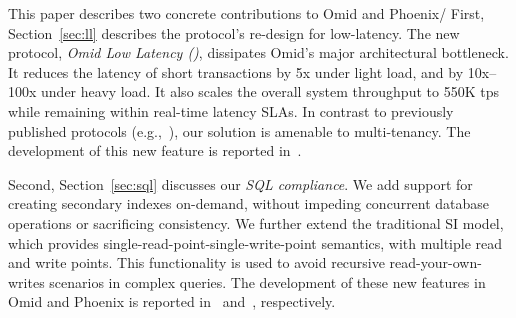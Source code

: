 This paper describes two concrete contributions to Omid and Phoenix/ 
First, Section~\ref{sec:ll} describes the 
protocol's re-design for low-latency.  
The new protocol,    \emph{Omid Low Latency (\sysll)}, 
dissipates Omid's major architectural bottleneck. 
It reduces the latency of short transactions by 5x under light load, and 
by 10x--100x under heavy load. %
It also scales 
the overall system throughput to 550K tps while remaining 
within real-time latency SLAs. In contrast to previously published protocols 
(e.g.,~\cite{Percolator2010}), our solution is amenable to multi-tenancy.
The development of this new feature is reported in~\cite{OMID-90}.

Second, Section~\ref{sec:sql} discusses our {\em SQL compliance}. 
We add support for creating secondary indexes on-demand, 
without impeding concurrent database operations or sacrificing consistency. 
We further extend the traditional SI model, which provides single-read-point-single-write-point semantics, with multiple read and write points. This functionality is used to avoid recursive read-your-own-writes scenarios in complex queries. 
The development of these new features in Omid and Phoenix is reported in~\cite{OMID-82} and~\cite{PHOENIX-3623}, respectively.





